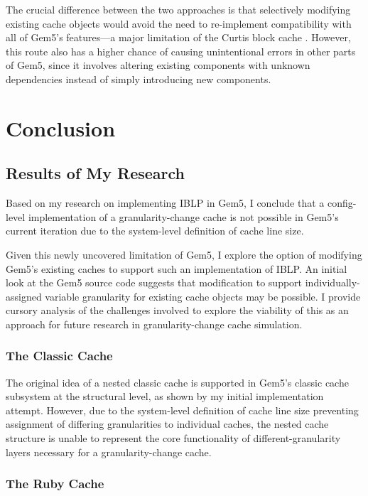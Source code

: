 \documentclass[12pt,twoside]{reedthesis}
\begin{document}
	The crucial difference between the two approaches is that selectively modifying existing cache objects would avoid the need to re-implement compatibility with all of Gem5's features---a major limitation of the Curtis block cache \cite{curtis}. However, this route also has a higher chance of causing unintentional errors in other parts of Gem5, since it involves altering existing components with unknown dependencies instead of simply introducing new components.

\chapter{Conclusion}

\section{Results of My Research}

	Based on my research on implementing IBLP in Gem5, I conclude that a config-level implementation of a granularity-change cache is not possible in Gem5's current iteration due to the system-level definition of cache line size.

	Given this newly uncovered limitation of Gem5, I explore the option of modifying Gem5's existing caches to support such an implementation of IBLP. An initial look at the Gem5 source code suggests that modification to support individually-assigned variable granularity for existing cache objects may be possible. I provide cursory analysis of the challenges involved to explore the viability of this as an approach for future research in granularity-change cache simulation.

	\subsection*{The Classic Cache}

	The original idea of a nested classic cache is supported in Gem5's classic cache subsystem at the structural level, as shown by my initial implementation attempt. However, due to the system-level definition of cache line size preventing assignment of differing granularities to individual caches, the nested cache structure is unable to represent the core functionality of different-granularity layers necessary for a granularity-change cache.

	\subsection*{The Ruby Cache}
\end{document}
